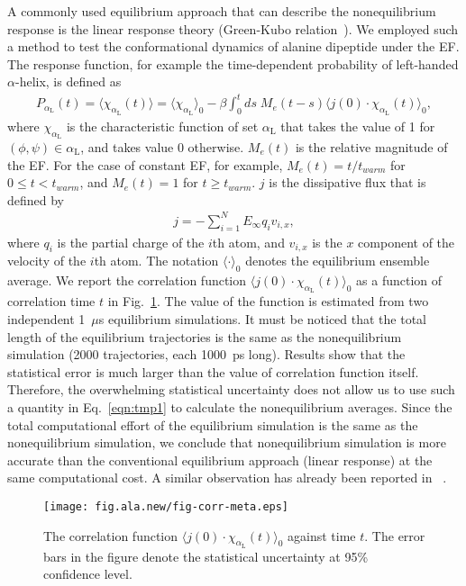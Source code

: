 \documentclass[a4paper,preprint,unsortedaddress,onecolumn]{revtex4-1}
\newcommand{\recheck}[1]{{\color{red} #1}}
\newcommand{\confc}[0]{{\alpha_{\textrm{L}}}}
\begin{document}
\recheck{
A commonly used equilibrium approach that can describe the nonequilibrium
response is the linear response theory (Green-Kubo relation~\cite{green1954markoff,kubo1957statistical}).
We employed such a method to test the
conformational dynamics of alanine dipeptide under the EF.
The response function, for example the time-dependent probability of
left-handed $\alpha$-helix, is defined as~\cite{tuckeman2010statistical}
\begin{align}\label{eqn:appdx1}
  P_\confc(t) = \langle\chi_{\confc}(t)\rangle = \langle \chi_{\confc} \rangle_0 -
  \beta \int_0^t ds\; M_e(t - s)\langle j(0)\cdot \chi_{\confc}(t) \rangle_0,
\end{align}
where $\chi_{\confc}$ is the characteristic function of set $\confc$ that takes
the value of 1 for $(\phi,\psi)\in \confc$, and takes value 0
otherwise. $M_e(t)$ is the relative magnitude of the EF. For the case of
constant EF, for example, $M_e(t) = t/t_{warm}$ for $0\leq t<t_{warm}$, and
$M_e(t) = 1$ for $t\geq t_{warm}$.
$j$ is the dissipative flux that is defined by
\begin{align}
  j = - \sum_{i=1}^N E_\infty q_i v_{i,x},
\end{align}
where $q_i$ is the partial charge of the $i$th atom, and $v_{i,x}$ is
the $x$ component of the velocity of the $i$th atom.  The notation
$\langle\cdot\rangle_0$ denotes the equilibrium ensemble average.
We report the correlation function
$\langle j(0)\cdot \chi_{\confc}(t) \rangle_0$ as a function of correlation time $t$
in Fig.~\ref{fig:appdx1}. The value of the function is estimated from
two independent 1~$\mu$s equilibrium simulations.
It must be noticed that the total length of the equilibrium
trajectories is the same as the nonequilibrium simulation (2000
trajectories, each 1000~ps long).
Results show that the statistical error is much larger than the value of
correlation function itself.  Therefore, the
overwhelming statistical uncertainty does not allow us to use such a quantity
in Eq.~\eqref{eqn:tmp1} to calculate the
nonequilibrium averages. 
Since the total computational effort of
the equilibrium simulation is the same as the nonequilibrium
simulation, we conclude that nonequilibrium simulation is more
accurate than the conventional equilibrium approach (linear response) at the same computational cost.
A similar
observation has already been reported in ~\cite{ciccotti1975direct}.
}

\begin{figure}
  \centering
  \texttt{[image: fig.ala.new/fig-corr-meta.eps]}
  \caption{The correlation function $\langle j(0)\cdot \chi_{\confc}(t)
    \rangle_0$ against time $t$. The error bars in the figure denote
    the statistical uncertainty at 95\% confidence level. }
  \label{fig:appdx1}
\end{figure}



{}

\end{document}
